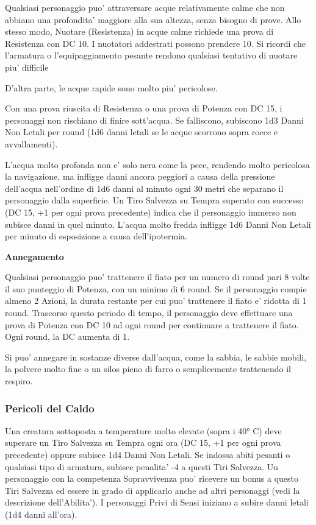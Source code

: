 \documentclass[a4paper,11pt,twoside,openany]{book}
\begin{document}
{		Qualsiasi personaggio puo' attraversare acque relativamente calme che non abbiano una profondita' maggiore alla sua altezza, senza bisogno di prove. Allo stesso modo, Nuotare (Resistenza) in acque calme richiede una prova di Resistenza con DC 10. I nuotatori addestrati possono prendere 10. Si ricordi che l'armatura o l'equipaggiamento pesante rendono qualsiasi tentativo di nuotare piu' difficile
		
		D'altra parte, le acque rapide sono molto piu' pericolose.
		
		Con una prova riuscita di Resistenza o una prova di Potenza con DC 15, i personaggi non rischiano di finire sott'acqua. Se falliscono, subiscono 1d3 Danni Non Letali per round (1d6 danni letali se le acque scorrono sopra rocce e avvallamenti).
		
		L'acqua molto profonda non e' solo nera come la pece, rendendo molto pericolosa la navigazione, ma infligge danni ancora peggiori a causa della pressione dell'acqua nell'ordine di 1d6 danni al minuto ogni 30 metri che separano il personaggio dalla superficie. Un Tiro Salvezza su Tempra superato con successo (DC 15, +1 per ogni prova precedente) indica che il personaggio immerso non subisce danni in quel minuto. L'acqua molto fredda infligge 1d6 Danni Non Letali per minuto di esposizione a causa dell'ipotermia.
		
		\textbf{Annegamento}
		
		Qualsiasi personaggio puo' trattenere il fiato per un numero di round pari 8 volte il suo punteggio di Potenza, con un minimo di 6 round. Se il personaggio compie almeno 2 Azioni, la durata restante per cui puo' trattenere il fiato e' ridotta di 1 round. Trascorso questo periodo di tempo, il personaggio deve effettuare una prova di Potenza con DC 10 ad ogni round per continuare a trattenere il fiato. Ogni round, la DC aumenta di 1.
		
		Si puo' annegare in sostanze diverse dall'acqua, come la sabbia, le sabbie mobili, la polvere molto fine o un silos pieno di farro o semplicemente trattenendo il respiro.
		
		\subsubsection{Pericoli del Caldo}
		
		\label{pericoli-del-caldo}
		
		Una creatura sottoposta a temperature molto elevate (sopra i 40° C) deve superare un Tiro Salvezza su Tempra ogni ora (DC 15, +1 per ogni prova precedente) oppure subisce 1d4 Danni Non Letali. Se indossa abiti pesanti o qualsiasi tipo di armatura, subisce penalita' -4 a questi Tiri Salvezza. Un personaggio con la competenza Sopravvivenza puo' ricevere un bonus a questo Tiri Salvezza ed essere in grado di applicarlo anche ad altri personaggi (vedi la descrizione dell'Abilita'). I personaggi Privi di Sensi iniziano a subire danni letali (1d4 danni all'ora).
		
}
\end{document}
